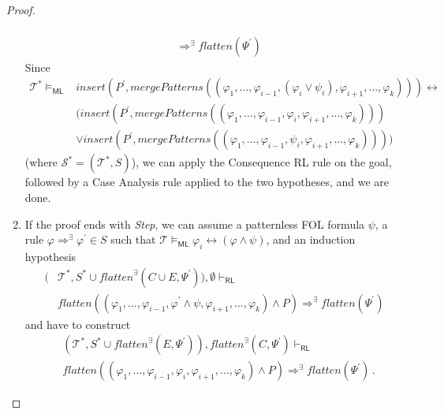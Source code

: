 \documentclass{article}
\newcommand{\RL}{\mathsf{RL}}
\newcommand{\ML}{\mathsf{ML}}
\begin{document}
\begin{proof}
\begin{enumerate}
\begin{align*}
            \\ & \Rightarrow^\exists
            \mathit{flatten}(\Psi^\prime)
        \end{align*}
        Since
        \begin{align*}
            \mathcal{T}^* \vDash_\ML & \mathit{insert}(P^\prime, \mathit{mergePatterns}((\varphi_1, \ldots, \varphi_{i-1}, (\varphi_i \lor \psi_i), \varphi_{i+1}, \ldots, \varphi_k))) \leftrightarrow \\
            & (\mathit{insert}(P^\prime, \mathit{mergePatterns}((\varphi_1, \ldots, \varphi_{i-1}, \varphi_i, \varphi_{i+1}, \ldots, \varphi_k))) \\
            & \lor \mathit{insert}(P^\prime, \mathit{mergePatterns}((\varphi_1, \ldots, \varphi_{i-1}, \psi_i, \varphi_{i+1}, \ldots, \varphi_k))))
        \end{align*}
        (where $\mathcal{S}^* = (\mathcal{T}^*, S)$),
        we can apply the Consequence RL rule on the goal, followed by a Case Analysis rule applied to the two hypotheses, and we are done.
        
    \item If the proof ends with \emph{Step},
      we can assume a patternless FOL formula $\psi$, a rule $\varphi \Rightarrow^\exists \varphi^\prime \in S$ such that
      $\mathcal{T} \vDash_\ML \varphi_i \leftrightarrow (\varphi \land \psi)$,
      and an induction hypothesis
      \begin{align*}
        (&\mathcal{T}^*, S^* \cup \mathit{flatten}^\exists(C \cup E, \Psi^\prime)), \emptyset \vdash_\RL
          \\ &
          \mathit{flatten}((\varphi_1, \ldots, \varphi_{i-1}, \varphi^\prime \land \psi, \varphi_{i+1}, \ldots, \varphi_k) \land P) \Rightarrow^\exists \mathit{flatten}(\Psi^\prime)     
      \end{align*}
      and have to construct
      \begin{align*}
      & (\mathcal{T}^*, S^* \cup \mathit{flatten}^\exists(E, \Psi^\prime)), \mathit{flatten}^\exists(C, \Psi^\prime) \vdash_\RL \\
          & \mathit{flatten}((\varphi_1, \ldots, \varphi_{i-1}, \varphi_i, \varphi_{i+1}, \ldots, \varphi_k) \land P) \Rightarrow^\exists \mathit{flatten}(\Psi^\prime)    \, .
      \end{align*}
      

\end{enumerate}
\end{proof}
\end{document}
